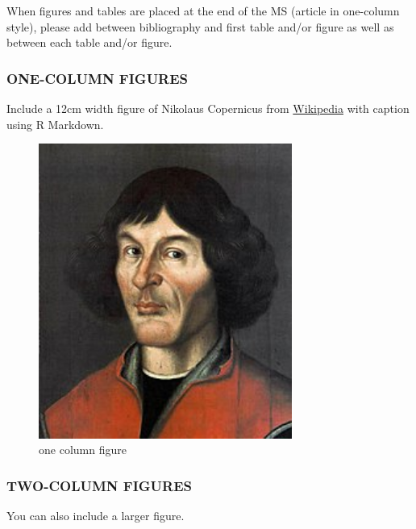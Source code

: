 \documentclass[, manuscript]{copernicus}
\begin{document}
When figures and tables are placed at the end of the MS (article in
one-column style), please add \clearpage between bibliography and first
table and/or figure as well as between each table and/or figure.

\subsubsection{ONE-COLUMN FIGURES}

Include a 12cm width figure of Nikolaus Copernicus from
\href{https://en.wikipedia.org/wiki/File:Nikolaus_Kopernikus.jpg}{Wikipedia}
with caption using R Markdown.

\begin{figure}
\includegraphics[width=8.3cm]{Nikolaus_Kopernikus} \caption{one column figure}\label{fig:unnamed-chunk-3}
\end{figure}

\subsubsection{TWO-COLUMN FIGURES}

You can also include a larger figure.
\end{document}
